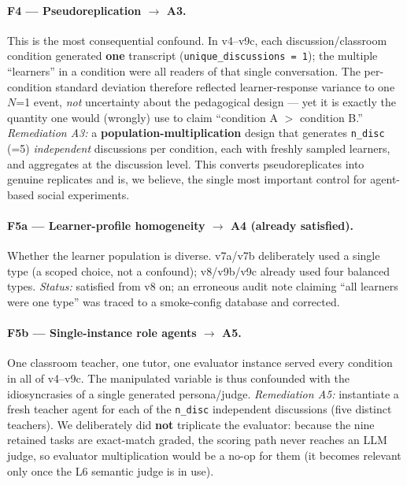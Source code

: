 \documentclass[11pt]{article}
\begin{document}
\paragraph{F4 --- Pseudoreplication $\to$ A3.}
This is the most consequential confound.  In v4--v9c, each discussion/classroom
condition generated \textbf{one} transcript (\texttt{unique\_discussions = 1}); the
multiple ``learners'' in a condition were all readers of that single conversation.
The per-condition standard deviation therefore reflected learner-response variance to
one $N$=1 event, \emph{not} uncertainty about the pedagogical design --- yet it is
exactly the quantity one would (wrongly) use to claim ``condition A $>$ condition B.''
\emph{Remediation A3:} a \textbf{population-multiplication} design that generates
\texttt{n\_disc} (=5) \emph{independent} discussions per condition, each with freshly
sampled learners, and aggregates at the discussion level.  This converts
pseudoreplicates into genuine replicates and is, we believe, the single most
important control for agent-based social experiments.

\paragraph{F5a --- Learner-profile homogeneity $\to$ A4 (already satisfied).}
Whether the learner population is diverse.  v7a/v7b deliberately used a single type
(a scoped choice, not a confound); v8/v9b/v9c already used four balanced types.
\emph{Status:} satisfied from v8 on; an erroneous audit note claiming ``all learners
were one type'' was traced to a smoke-config database and corrected.

\paragraph{F5b --- Single-instance role agents $\to$ A5.}
One classroom teacher, one tutor, one evaluator instance served every condition in
all of v4--v9c.  The manipulated variable is thus confounded with the idiosyncrasies
of a single generated persona/judge.  \emph{Remediation A5:} instantiate a fresh
teacher agent for each of the \texttt{n\_disc} independent discussions (five distinct
teachers).  We deliberately did \textbf{not} triplicate the evaluator: because the
nine retained tasks are exact-match graded, the scoring path never reaches an LLM
judge, so evaluator multiplication would be a no-op for them (it becomes relevant
only once the L6 semantic judge is in use).
\end{document}
